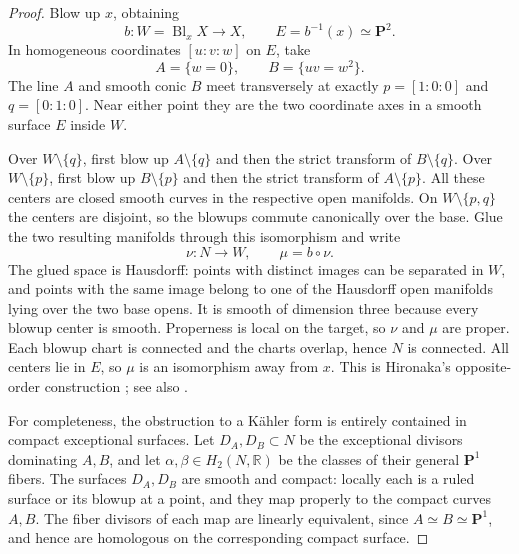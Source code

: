 \documentclass[11pt]{amsart}
\theoremstyle{definition}
\theoremstyle{remark}
\numberwithin{equation}{section}
\newcommand{\R}{\mathbb R}
\newcommand{\PP}{\mathbf P}
\newcommand{\Bl}{\operatorname{Bl}}
\begin{document}
\begin{proof}
Blow up $x$, obtaining
\[
 b:W=\Bl_xX\longrightarrow X,\qquad E=b^{-1}(x)\simeq\PP^2.
\]
In homogeneous coordinates $[u:v:w]$ on $E$, take
\[
 A=\{w=0\},\qquad B=\{uv=w^2\}.
\]
The line $A$ and smooth conic $B$ meet transversely at exactly
$p=[1:0:0]$ and $q=[0:1:0]$.  Near either point they are the two
coordinate axes in a smooth surface $E$ inside $W$.

Over $W\setminus\{q\}$, first blow up $A\setminus\{q\}$ and then
the strict transform of $B\setminus\{q\}$.  Over
$W\setminus\{p\}$, first blow up $B\setminus\{p\}$ and then the
strict transform of $A\setminus\{p\}$.  All these centers are closed
smooth curves in the respective open manifolds.  On
$W\setminus\{p,q\}$ the centers are disjoint, so the blowups commute
canonically over the base.  Glue the two resulting manifolds through
this isomorphism and write
\[
 \nu:N\longrightarrow W,\qquad \mu=b\circ\nu.
\]
The glued space is Hausdorff: points with distinct images can be
separated in $W$, and points with the same image belong to one of the
Hausdorff open manifolds lying over the two base opens.  It is smooth
of dimension three because every blowup center is smooth.  Properness
is local on the target, so $\nu$ and $\mu$ are proper.  Each blowup
chart is connected and the charts overlap, hence $N$ is connected.
All centers lie in $E$, so $\mu$ is an isomorphism away from $x$.
This is Hironaka's opposite-order construction
\cite[Section~6]{Barlet2015}; see also \cite[Tag~08J1]{StacksHironaka}.

For completeness, the obstruction to a K\"ahler form is entirely
contained in compact exceptional surfaces.  Let $D_A,D_B\subset N$
be the exceptional divisors dominating $A,B$, and let
$\alpha,\beta\in H_2(N,\R)$ be the classes of their general
$\PP^1$ fibers.  The surfaces $D_A,D_B$ are smooth and compact:
locally each is a ruled surface or its blowup at a point, and they
map properly to the compact curves $A,B$.  The fiber divisors of
each map are linearly equivalent, since $A\simeq B\simeq\PP^1$,
and hence are homologous on the corresponding compact surface.


\end{proof}
\end{document}
